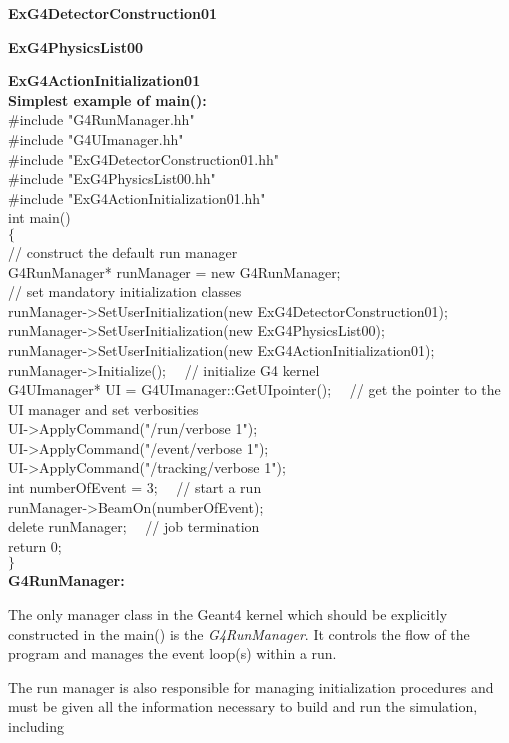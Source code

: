 \textbf{ExG4DetectorConstruction01}

\textbf{ExG4PhysicsList00}

\textbf{ExG4ActionInitialization01}\\
\textbf{Simplest example of main():}\cite{geant4}\\
$\#$include "G4RunManager.hh" \\
$\#$include "G4UImanager.hh" \\
$\#$include "ExG4DetectorConstruction01.hh" \\
$\#$include "ExG4PhysicsList00.hh" \\
$\#$include "ExG4ActionInitialization01.hh"\\
int main()\\
$\{$ \\ 
// construct the default run manager \\
G4RunManager* runManager = new G4RunManager;\\
// set mandatory initialization classes \\
runManager->SetUserInitialization(new ExG4DetectorConstruction01); \\
runManager->SetUserInitialization(new ExG4PhysicsList00);\\
runManager->SetUserInitialization(new ExG4ActionInitialization01);\\
runManager->Initialize();    \, \,    // initialize G4 kernel\\
G4UImanager* UI = G4UImanager::GetUIpointer();    \, \,    // get the pointer to the UI manager and set verbosities\\
UI->ApplyCommand("/run/verbose 1");\\
UI->ApplyCommand("/event/verbose 1");\\
UI->ApplyCommand("/tracking/verbose 1");\\
int numberOfEvent = 3;   \, \,    // start a run \\
runManager->BeamOn(numberOfEvent);\\
delete runManager;  \, \,    // job termination \\
return 0;\\
$\}$\\

\textbf{G4RunManager:}

The only manager class in the Geant4 kernel which should be explicitly constructed in the main() is the \textit{G4RunManager}. It controls the flow of the program and manages the event loop(s) within a run.

The run manager is also responsible for managing initialization procedures and must be given all the information necessary to build and run the simulation, including


